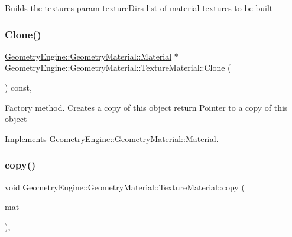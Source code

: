 Builds the textures param texture\+Dirs list of material textures to be built \mbox{\label{class_geometry_engine_1_1_geometry_material_1_1_texture_material_ace905cf02deb41ad8aa422ef2fb9070f}} 
\subsubsection{\texorpdfstring{Clone()}{Clone()}}
{\footnotesize\ttfamily \mbox{\hyperlink{class_geometry_engine_1_1_geometry_material_1_1_material}{Geometry\+Engine\+::\+Geometry\+Material\+::\+Material}} $\ast$ Geometry\+Engine\+::\+Geometry\+Material\+::\+Texture\+Material\+::\+Clone (\begin{DoxyParamCaption}{ }\end{DoxyParamCaption}) const\hspace{0.3cm}{\ttfamily [override]}, {\ttfamily [virtual]}}

Factory method. Creates a copy of this object return Pointer to a copy of this object 

Implements \mbox{\hyperlink{class_geometry_engine_1_1_geometry_material_1_1_material_ae5513ff06d536365e18ddc5e07e79784}{Geometry\+Engine\+::\+Geometry\+Material\+::\+Material}}.

\mbox{\label{class_geometry_engine_1_1_geometry_material_1_1_texture_material_a946658ad56ad140e6e5ec5d12a15affc}} 
\subsubsection{\texorpdfstring{copy()}{copy()}}
{\footnotesize\ttfamily void Geometry\+Engine\+::\+Geometry\+Material\+::\+Texture\+Material\+::copy (\begin{DoxyParamCaption}\item[{const \mbox{\hyperlink{class_geometry_engine_1_1_geometry_material_1_1_texture_material}{Texture\+Material}} \&}]{mat }\end{DoxyParamCaption})\hspace{0.3cm}{\ttfamily [protected]}, {\ttfamily [virtual]}}

